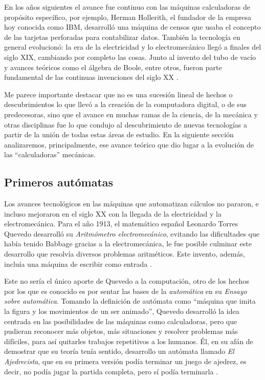\documentclass[letterpaper,12pt,oneside]{book}
\begin{document}
		En los años siguientes el avance fue continuo con las máquinas calculadoras de propósito específico, por ejemplo, Herman Hollerith,
		el fundador de la empresa hoy conocida como IBM,
		desarrolló una máquina de censos que usaba el concepto de las tarjetas perforadas para
        contabilizar datos. También la tecnología en general evolucionó:
		la era de la electricidad y lo electromecánico llegó a finales del siglo XIX, cambiando por completo las cosas. Junto al invento del tubo de vacío y avances teóricos como el álgebra de Boole, entre otros, fueron parte fundamental de las continuas invenciones del siglo XX \cite[p. 127]{ifrah_universal_2001}.
  
        Me parece importante destacar que no es una sucesión lineal de hechos o descubrimientos
		lo que llevó a la creación de la computadora digital, o de sus predecesoras, sino que el avance en muchas ramas de la ciencia, de la mecánica y otras
		disciplinas fue lo que condujo al descubrimiento de nuevas tecnologías a partir de la unión de todas estas áreas de estudio. En la siguiente sección analizaremos, principalmente, ese avance teórico que dio lugar a la evolución de las ``calculadoras'' mecánicas.
		

			
		\subsection{Primeros autómatas}
		
		Los avances tecnológicos en las máquinas que automatizan cálculos no pararon, e incluso mejoraron en el siglo XX con la llegada de la electricidad
		y la electromecánica. Para el año 1913, el matemático español Leonardo Torres Quevedo desarrolló su \textit{Aritmómetro electromecánico}, evitando las
		dificultades que había tenido Babbage gracias a la electromecánica, le fue posible culminar este desarrollo que resolvía diversos
		problemas aritméticos. Este invento, además, incluía una máquina de escribir como entrada \cite{museo_torres_quevedo_ajedrecista_nodate,ifrah_universal_2001}.
  
        Este no sería el único aporte de Quevedo
		a la computación, otro de los hechos por los que es conocido es por sentar las bases de la \textit{automática} en su \textit{Ensayo sobre automática}.
		Tomando
		la definición de autómata como ``máquina que imita la figura y los movimientos de un ser animado'', Quevedo desarrolló la idea centrada en las posibilidades
		de las máquinas como calculadoras, pero que pudieran reconocer más objetos, más situaciones y resolver problemas más difíciles, para así
		quitarles trabajos repetitivos a los humanos. Él, en su afán de demostrar que su teoría tenía sentido, desarrollo un autómata llamado
		\textit{El Ajedrecista}, que en su primera versión podía terminar un juego de ajedrez, es decir, no podía jugar la partida completa,
		pero sí podía terminarla \cite{museo_torres_quevedo_ajedrecista_nodate,ifrah_universal_2001}.
		
\end{document}
